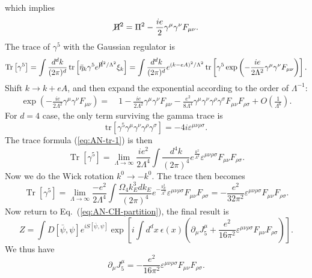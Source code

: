 \documentclass[aps,prb,superscriptaddress,nofootinbib]{revtex4}
\def \tr{\operatorname{tr}}
\def \Tr{\operatorname{Tr}}
\begin{document}
which implies
\begin{equation}
	\cancel{\Pi}^2 = \Pi^2 - \frac{ie}{2}\gamma^\mu \gamma^\nu F_{\mu\nu}.
\end{equation}
The trace of $\gamma^5$ with the Gaussian regulator is
\begin{equation}
	\Tr\left[\gamma^5\right] 
	= \int \frac{d^d k}{(2\pi)^d} \tr\left[\bar\eta_k \gamma^5 e^{\cancel{\Pi}^2/\Lambda^2}\xi_k \right] 
	= \int \frac{d^d k}{(2\pi)^d} e^{(k-eA)^2/\Lambda^2}\tr\left[\gamma^5 \exp\left(-\frac{ie}{2\Lambda^2} \gamma^\mu \gamma^\nu F_{\mu\nu}\right)\right].
\end{equation}
Shift $k \rightarrow k + e A$, and then expand the exponential according to the order of $\Lambda^{-1}$:
\begin{equation}
\begin{aligned}
	\exp\left(-\frac{ie}{2\Lambda^2} \gamma^\mu \gamma^\nu F_{\mu\nu}\right)
	=&\ 1-\frac{ie}{2\Lambda^2} \gamma^\mu \gamma^\nu F_{\mu\nu}-\frac{e^2}{8\Lambda^4} \gamma^\mu \gamma^\nu \gamma^\rho \gamma^\sigma F_{\mu\nu} F_{\rho\sigma} + O\left(\frac{1}{\Lambda^6}\right).
\end{aligned}
\end{equation}
For $d=4$ case, the only term surviving the gamma trace is
\begin{equation}
	\mathrm{tr} \left[\gamma^5 \gamma^\mu \gamma^\nu \gamma^\rho \gamma^\sigma \right] 
	= -4i\varepsilon^{\mu\nu\rho\sigma}.
\end{equation}
The trace formula (\ref{eq:AN-tr-1}) is then
\begin{equation}
	\Tr[\gamma^5] = \lim_{\Lambda\rightarrow\infty} \frac{ie^2}{2\Lambda^4} \int \frac{d^4k}{(2\pi)^4} e^{\frac{k^2}{\Lambda^2}}  \varepsilon^{\mu\nu\rho\sigma}F_{\mu\nu} F_{\rho\sigma}.
\end{equation}
Now we do the Wick rotation $k^0 \rightarrow -k^0$. 
The trace then becomes
\begin{equation}
	\Tr[\gamma^5] = \lim_{\Lambda\rightarrow\infty} \frac{-e^2}{2\Lambda^4} \int \frac{\Omega_4 k^3_E dk_E}{(2\pi)^4} e^{-\frac{k_E^2}{\Lambda^2}}  \varepsilon^{\mu\nu\rho\sigma}F_{\mu\nu} F_{\rho\sigma} 
	= -\frac{e^2}{32\pi^2} \varepsilon^{\mu\nu\rho\sigma}F_{\mu\nu} F_{\rho\sigma}.
\end{equation}
Now return to Eq.~(\ref{eq:AN-CH-partition}), the final result is
\begin{equation}
	Z = \int D[\bar\psi,\psi] e^{iS[\bar\psi,\psi]} \exp\left[i\int d^d x \ \epsilon(x) \left(\partial_\mu J_5^\mu+ \frac{e^2}{16\pi^2}\varepsilon^{\mu\nu\rho\sigma}F_{\mu\nu} F_{\rho\sigma}\right)\right].
\end{equation}
We thus have
\begin{equation}
	\partial_\mu J^\mu_5 = -\frac{e^2}{16\pi^2}\varepsilon^{\mu\nu\rho\sigma}F_{\mu\nu} F_{\rho\sigma}.
\end{equation}
\end{document}
